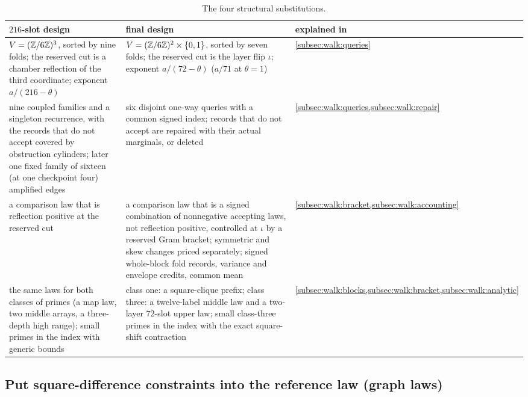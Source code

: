 \begin{table}[htbp]
\centering
\small
\caption{The four structural substitutions.}\label{tab:walk:substitutions}
\begin{tabular}{@{}>{\raggedright\arraybackslash}p{}%
>{\raggedright\arraybackslash}p{}%
>{\raggedright\arraybackslash}p{}@{}}
\toprule
$216$-slot design & final design & explained in\\
\midrule
$V=(\mathbb Z/6\mathbb Z)^3$, sorted by nine folds; the reserved cut is a chamber
reflection of the third coordinate; exponent $a/(216-\theta)$
& $V=(\mathbb Z/6\mathbb Z)^2\times\{0,1\}$, sorted by seven folds; the reserved cut is the
layer flip $\iota$; exponent $a/(72-\theta)$ ($a/71$ at $\theta=1$)
& \cref{subsec:walk:queries}\\
\addlinespace
nine coupled families and a singleton recurrence, with the records that do
not accept covered by obstruction cylinders; later one fixed family of
sixteen (at one checkpoint four) amplified edges
& six disjoint one-way queries with a common signed index; records that do
not accept are repaired with their actual marginals, or deleted
& \cref{subsec:walk:queries,subsec:walk:repair}\\
\addlinespace
a comparison law that is reflection positive at the reserved cut
& a comparison law that is a signed combination of nonnegative accepting
laws, not reflection positive, controlled at $\iota$ by a reserved Gram
bracket; symmetric and skew changes priced separately; signed whole-block
fold records, variance and envelope credits, common mean
& \cref{subsec:walk:bracket,subsec:walk:accounting}\\
\addlinespace
the same laws for both classes of primes (a map law, two middle arrays, a
three-depth high range); small primes in the index with generic bounds
& class one: a square-clique prefix; class three: a twelve-label middle law
and a two-layer $72$-slot upper law; small class-three primes in the index
with the exact square-shift contraction
& \cref{subsec:walk:blocks,subsec:walk:bracket,subsec:walk:analytic}\\
\bottomrule
\end{tabular}
\end{table}

\subsection{Put square-difference constraints into the reference law (graph laws)}\label{subsec:walk:graph-laws}

